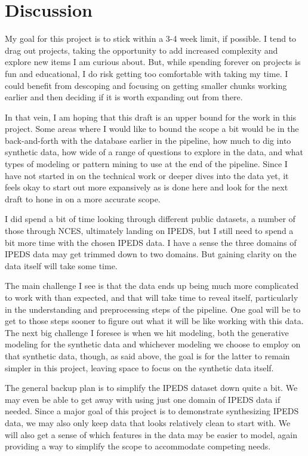 \documentclass[sigconf, authorversion, nonacm]{acmart}
\begin{document}
\section{Discussion}





    My goal for this project is to stick within a 3-4 week limit, if possible. I tend to drag out projects, taking the opportunity to add increased complexity and explore new items I am curious about. But, while spending forever on projects is fun and educational, I do risk getting too comfortable with taking my time. I could benefit from descoping and focusing on getting smaller chunks working earlier and then deciding if it is worth expanding out from there.

    In that vein, I am hoping that this draft is an upper bound for the work in this project. Some areas where I would like to bound the scope a bit would be in the back-and-forth with the database earlier in the pipeline, how much to dig into synthetic data, how wide of a range of questions to explore in the data, and what types of modeling or pattern mining to use at the end of the pipeline. Since I have not started in on the technical work or deeper dives into the data yet, it feels okay to start out more expansively as is done here and look for the next draft to hone in on a more accurate scope.

    I did spend a bit of time looking through different public datasets, a number of those through NCES, ultimately landing on IPEDS, but I still need to spend a bit more time with the chosen IPEDS data. I have a sense the three domains of IPEDS data may get trimmed down to two domains. But gaining clarity on the data itself will take some time.

    The main challenge I see is that the data ends up being much more complicated to work with than expected, and that will take time to reveal itself, particularly in the understanding and preprocessing steps of the pipeline. One goal will be to get to those steps sooner to figure out what it will be like working with this data. The next big challenge I foresee is when we hit modeling, both the generative modeling for the synthetic data and whichever modeling we choose to employ on that synthetic data, though, as said above, the goal is for the latter to remain simpler in this project, leaving space to focus on the synthetic data itself.

    The general backup plan is to simplify the IPEDS dataset down quite a bit. We may even be able to get away with using just one domain of IPEDS data if needed. Since a major goal of this project is to demonstrate synthesizing IPEDS data, we may also only keep data that looks relatively clean to start with. We will also get a sense of which features in the data may be easier to model, again providing a way to simplify the scope to accommodate competing needs.
\end{document}
